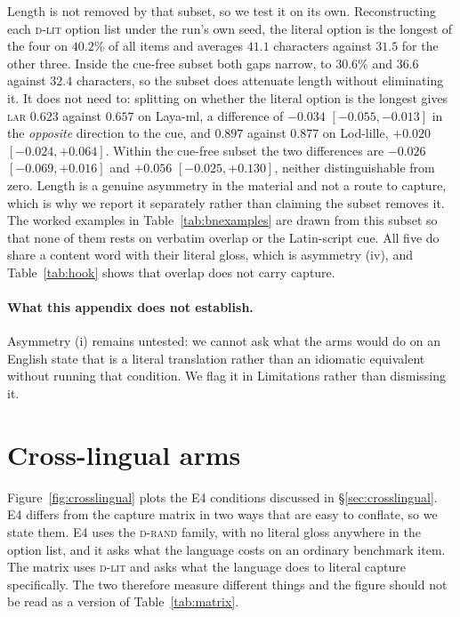 \documentclass[11pt]{article}
\newcommand{\Drand}{\textsc{d-rand}}
\newcommand{\Dlit}{\textsc{d-lit}}
\newcommand{\LAR}{\textsc{lar}}
\begin{document}
Length is not removed by that subset, so we test it on its own. Reconstructing each
\Dlit{} option list under the run's own seed, the literal option is the longest of
the four on $40.2\%$ of all items and averages $41.1$ characters against $31.5$ for
the other three. Inside the cue-free subset both gaps narrow, to $30.6\%$ and
$36.6$ against $32.4$ characters, so the subset does attenuate length without
eliminating it. It does not need to: splitting on whether the literal option is the
longest gives \LAR{} $0.623$ against $0.657$ on Laya-ml, a difference of $-0.034$
$[-0.055, -0.013]$ in the \emph{opposite} direction to the cue, and $0.897$ against
$0.877$ on Lod-lille, $+0.020$ $[-0.024, +0.064]$. Within the cue-free subset the
two differences are $-0.026$ $[-0.069, +0.016]$ and $+0.056$ $[-0.025, +0.130]$,
neither distinguishable from zero. Length is a genuine asymmetry in the material
and not a route to capture, which is why we report it separately rather than
claiming the subset removes it. The worked examples in
Table~\ref{tab:bnexamples} are drawn from this subset so that none of them rests
on verbatim overlap or the Latin-script cue. All five do share a content word with
their literal gloss, which is asymmetry (iv), and Table~\ref{tab:hook} shows that
overlap does not carry capture.

\paragraph{What this appendix does not establish.} Asymmetry (i) remains untested:
we cannot ask what the arms would do on an English state that is a literal
translation rather than an idiomatic equivalent without running that condition. We
flag it in Limitations rather than dismissing it.

\section{Cross-lingual arms}
\label{app:crossling}

Figure~\ref{fig:crosslingual} plots the E4 conditions discussed in
\S\ref{sec:crosslingual}. E4 differs from the capture matrix in two ways that are
easy to conflate, so we state them. E4 uses the \Drand{} family, with no literal
gloss anywhere in the option list, and it asks what the language costs on an
ordinary benchmark item. The matrix uses \Dlit{} and asks what the language does
to literal capture specifically. The two therefore measure different things and
the figure should not be read as a version of Table~\ref{tab:matrix}.
\end{document}
